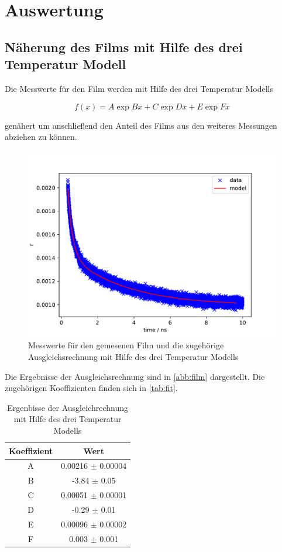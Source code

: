 \section{Auswertung}

\subsection{Näherung des Films mit Hilfe des drei Temperatur Modell}
Die Messwerte für den Film werden mit Hilfe des drei Temperatur Modells

\begin{equation}
f(x) = A\exp{Bx} + C\exp{Dx} + E\exp{Fx}
\end{equation}

\noindent genähert um anschließend den Anteil des Films aus den weiteres Messungen abziehen zu können.

\begin{figure}[h!]
 	\centering
 	\includegraphics[width=\textwidth]{img/002_a000_b0_e245_FILM.pdf}
 	\caption{Messwerte für den gemesenen Film und die zugehörige Ausgleichsrechnung mit Hilfe des drei Temperatur Modells}
 	\label{abb:film}
\end{figure}

Die Ergebnisse der Ausgleichsrechnung sind in \autoref{abb:film} dargestellt. Die zugehörigen Koeffizienten finden sich in \autoref{tab:fit}.

\begin{table}[h!]
 \centering
\begin{tabular}{cc}
    Koeffizient & Wert \\
	\midrule
 	A & 0.00216 $\pm$ 0.00004 \\
 	B & -3.84 $\pm$ 0.05 \\
 	C & 0.00051 $\pm$ 0.00001 \\
 	D & -0.29 $\pm$ 0.01 \\
 	E & 0.00096 $\pm$ 0.00002 \\
 	F & 0.003 $\pm$ 0.001 \\
\end{tabular}
\caption{Ergenbisse der Ausgleichrechnung mit Hilfe des drei Temperatur Modells}
\label{tab:fit}
\end{table}


